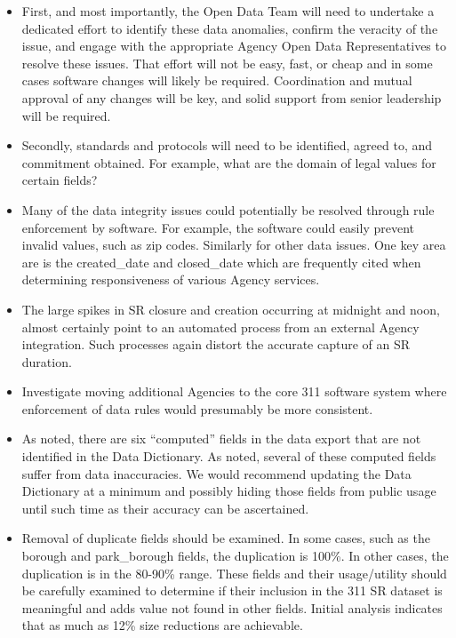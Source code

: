 \documentclass[12pt, titlepage]{article}
\begin{document}
\begin{itemize}
	\item First, and most importantly, the Open Data Team will need 
	to undertake a dedicated effort to identify these 
	data anomalies, confirm the veracity of the issue, 
	and engage with the appropriate Agency Open Data 
	Representatives to resolve these issues. That effort will not 
	be easy, fast, or cheap and in some cases software changes will likely 
	be required. Coordination and mutual approval of any 
	changes will be key, and solid support from senior leadership 
	will be required.

	\item Secondly, standards and protocols will need to be 
	identified, agreed to, and commitment obtained. For example, 
	what are the domain of legal values for certain fields?

	\item Many of the data integrity issues could potentially be 
	resolved through rule enforcement by software. For example, the 
	software could easily prevent invalid values, such as zip 
	codes. Similarly for other data issues. One key area are is the 
	created\_date and closed\_date which are frequently cited 
	when determining responsiveness of various Agency services.
	
	\item The large spikes in SR closure and creation occurring at 
	midnight and noon, almost certainly point to an automated 
	process from an external Agency integration. Such processes again distort 
	the accurate capture of an SR duration.
	
	\item Investigate moving additional Agencies to the core 
	311 software system where enforcement of data rules would 
	presumably be more consistent.
	
	\item As noted, there are six ``computed'' fields in the data export 
	that are not identified in the Data Dictionary. As noted, several of 
	these computed fields suffer from data inaccuracies. We would 
	recommend updating the Data Dictionary at a minimum and 
	possibly hiding those fields from public usage until such time as 
	their accuracy can be ascertained.
	
	\item Removal of duplicate fields should be examined.  In some cases, such 
	as the borough and park\_borough fields, the duplication is 100\%. In 
	other cases, the duplication is in the 80-90\% range. These fields and 
	their usage/utility should be carefully examined to determine if 
	their inclusion in the 311 SR dataset is meaningful and adds value not found 
	in other fields. Initial analysis indicates that as much as 12\% 
	size reductions are achievable.
	

\end{itemize}
\end{document}

